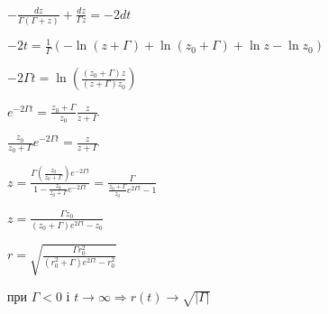 $-\frac{dz}{\Gamma(\Gamma + z)} + \frac{dz}{\Gamma z} = -2dt$

$-2t = \frac{1}{\Gamma}(-\ln(z+\Gamma) + \ln(z_0+\Gamma) + \ln z - \ln z_0)$

$-2\Gamma t = \ln(\frac{(z_0 + \Gamma)z}{(z+\Gamma)z_0})$

$e^{-2\Gamma t} = \frac{z_0 + \Gamma}{z_0} \frac{z}{z+\Gamma}$

$\frac{z_0}{z_0+\Gamma} e^{-2\Gamma t} = \frac{z}{z+\Gamma}$

$z = \frac{\Gamma(\frac{z_0}{z_0+\Gamma})e^{-2\Gamma t}}{1-\frac{z_0}{z_0+\Gamma}e^{-2\Gamma t}} = 
\frac{\Gamma}{\frac{z_0+\Gamma}{z_0}e^{2\Gamma t} - 1}$

$z = \frac{\Gamma z_0}{(z_0+\Gamma)e^{2\Gamma t} - z_0}$

$r = \sqrt{\frac{\Gamma r^2_0}{(r^2_0+\Gamma)e^{2\Gamma t} - r^2_0}}$

при $ \Gamma < 0$ і $t \rightarrow \infty \Longrightarrow r(t)\rightarrow \sqrt{|\Gamma|}$ 